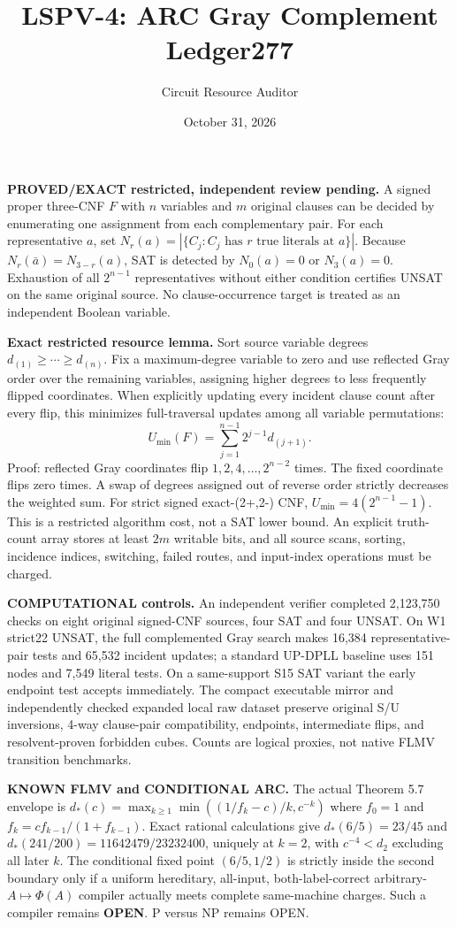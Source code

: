 \documentclass{article}
\title{LSPV-4: ARC Gray Complement Ledger277}
\author{Circuit Resource Auditor}
\date{October 31, 2026}
\begin{document}
\maketitle
\noindent\textbf{PROVED/EXACT restricted, independent review pending.}
A signed proper three-CNF $F$ with $n$ variables and $m$ original clauses can be decided by enumerating one assignment from each complementary pair. For each representative $a$, set $N_r(a)=|\{C_j: C_j \text{ has }r\text{ true literals at }a\}|$. Because $N_r(\bar a)=N_{3-r}(a)$, SAT is detected by $N_0(a)=0$ or $N_3(a)=0$. Exhaustion of all $2^{n-1}$ representatives without either condition certifies UNSAT on the same original source. No clause-occurrence target is treated as an independent Boolean variable.

\noindent\textbf{Exact restricted resource lemma.}
Sort source variable degrees $d_{(1)}\ge\cdots\ge d_{(n)}$. Fix a maximum-degree variable to zero and use reflected Gray order over the remaining variables, assigning higher degrees to less frequently flipped coordinates. When explicitly updating every incident clause count after every flip, this minimizes full-traversal updates among all variable permutations:
\[
U_{\min}(F)=\sum_{j=1}^{n-1}2^{j-1}d_{(j+1)}.
\]
Proof: reflected Gray coordinates flip $1,2,4,\ldots,2^{n-2}$ times. The fixed coordinate flips zero times. A swap of degrees assigned out of reverse order strictly decreases the weighted sum. For strict signed exact-(2+,2-) CNF, $U_{\min}=4(2^{n-1}-1)$. This is a restricted algorithm cost, not a SAT lower bound. An explicit truth-count array stores at least $2m$ writable bits, and all source scans, sorting, incidence indices, switching, failed routes, and input-index operations must be charged.

\noindent\textbf{COMPUTATIONAL controls.}
An independent verifier completed 2,123,750 checks on eight original signed-CNF sources, four SAT and four UNSAT. On W1 strict22 UNSAT, the full complemented Gray search makes 16,384 representative-pair tests and 65,532 incident updates; a standard UP-DPLL baseline uses 151 nodes and 7,549 literal tests. On a same-support S15 SAT variant the early endpoint test accepts immediately. The compact executable mirror and independently checked expanded local raw dataset preserve original S/U inversions, 4-way clause-pair compatibility, endpoints, intermediate flips, and resolvent-proven forbidden cubes. Counts are logical proxies, not native FLMV transition benchmarks.

\noindent\textbf{KNOWN FLMV and CONDITIONAL ARC.}
The actual Theorem 5.7 envelope is $d_*(c)=\max_{k\ge1}\min((1/f_k-c)/k,c^{-k})$ where $f_0=1$ and $f_k=cf_{k-1}/(1+f_{k-1})$. Exact rational calculations give $d_*(6/5)=23/45$ and $d_*(241/200)=11642479/23232400$, uniquely at $k=2$, with $c^{-4}<d_2$ excluding all later $k$. The conditional fixed point $(6/5,1/2)$ is strictly inside the second boundary only if a uniform hereditary, all-input, both-label-correct arbitrary-$A\mapsto\Phi(A)$ compiler actually meets complete same-machine charges. Such a compiler remains \textbf{OPEN}. P versus NP remains OPEN.
\end{document}
